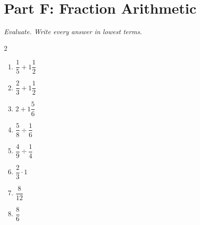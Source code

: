 \documentclass[11pt]{article}
\begin{document}
\section*{Part F: Fraction Arithmetic}
\noindent\textit{Evaluate. Write every answer in lowest terms.}
\begin{multicols}{2}
\begin{enumerate}
  \item $\dfrac{1}{5} + 1\dfrac{1}{2}$
  \vspace{1.4cm}
  \item $\dfrac{2}{3} + 1\dfrac{1}{2}$
  \vspace{1.4cm}
  \item $2 + 1\dfrac{5}{6}$
  \vspace{1.4cm}
  \item $\dfrac{5}{8} \div \dfrac{1}{6}$
  \vspace{1.4cm}
  \item $\dfrac{4}{9} \div \dfrac{1}{4}$
  \vspace{1.4cm}
  \item $\dfrac{2}{3} \cdot 1$
  \vspace{1.4cm}
  \item $\dfrac{8}{12}$
  \vspace{1.4cm}
  \item $\dfrac{8}{6}$
  \vspace{1.4cm}
\end{enumerate}
\end{multicols}
\end{document}
